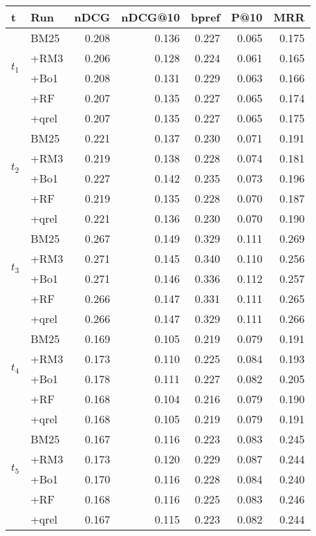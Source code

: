 \begin{tabular}{llrrrrr}
    \toprule
    t & Run & nDCG & nDCG@10 & bpref & P@10 & MRR \\
    \midrule
    \multirow[c]{4}{*}{$t_1$} & BM25 & 0.208 & 0.136 & 0.227 & 0.065 & 0.175 \\
    & +RM3 & 0.206 & 0.128 & 0.224 & 0.061 & 0.165 \\
    & +Bo1 & 0.208 & 0.131 & 0.229 & 0.063 & 0.166 \\
    & +RF & 0.207 & 0.135 & 0.227 & 0.065 & 0.174 \\
    & +qrel & 0.207 & 0.135 & 0.227 & 0.065 & 0.175 \\\midrule

   \multirow[c]{4}{*}{$t_2$} & BM25 & 0.221 & 0.137 & 0.230 & 0.071 & 0.191 \\
    & +RM3 & 0.219 & 0.138 & 0.228 & 0.074 & 0.181 \\
    & +Bo1 & 0.227 & 0.142 & 0.235 & 0.073 & 0.196 \\
    & +RF & 0.219 & 0.135 & 0.228 & 0.070 & 0.187 \\
    & +qrel & 0.221 & 0.136 & 0.230 & 0.070 & 0.190 \\\midrule

   \multirow[c]{4}{*}{$t_3$} & BM25 & 0.267 & 0.149 & 0.329 & 0.111 & 0.269 \\
    & +RM3 & 0.271 & 0.145 & 0.340 & 0.110 & 0.256 \\
    & +Bo1 & 0.271 & 0.146 & 0.336 & 0.112 & 0.257 \\
    & +RF & 0.266 & 0.147 & 0.331 & 0.111 & 0.265 \\
    & +qrel & 0.266 & 0.147 & 0.329 & 0.111 & 0.266 \\\midrule

   \multirow[c]{4}{*}{$t_4$} & BM25 & 0.169 & 0.105 & 0.219 & 0.079 & 0.191 \\
    & +RM3 & 0.173 & 0.110 & 0.225 & 0.084 & 0.193 \\
    & +Bo1 & 0.178 & 0.111 & 0.227 & 0.082 & 0.205 \\
    & +RF & 0.168 & 0.104 & 0.216 & 0.079 & 0.190 \\
    & +qrel & 0.168 & 0.105 & 0.219 & 0.079 & 0.191 \\\midrule
    
   \multirow[c]{4}{*}{$t_5$} & BM25 & 0.167 & 0.116 & 0.223 & 0.083 & 0.245 \\
    & +RM3 & 0.173 & 0.120 & 0.229 & 0.087 & 0.244 \\
    & +Bo1 & 0.170 & 0.116 & 0.228 & 0.084 & 0.240 \\
    & +RF & 0.168 & 0.116 & 0.225 & 0.083 & 0.246 \\
    & +qrel & 0.167 & 0.115 & 0.223 & 0.082 & 0.244 \\
    \bottomrule
\end{tabular}
    

